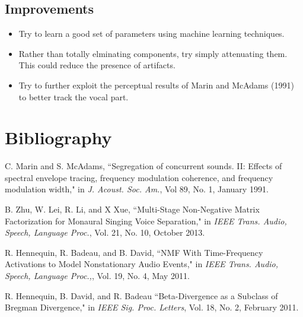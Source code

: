 \documentclass[72pt]{article}
\begin{document}
\begin{Huge}
\newpage

\section*{Improvements}
\begin{itemize}
    \item Try to learn a good set of parameters using machine learning
techniques.
    \item Rather than totally elminating components, try simply attenuating
them. This could reduce the presence of artifacts.
    \item Try to further exploit the perceptual results of Marin and McAdams
(1991) to better track the vocal part.
\end{itemize}

\end{Huge}

\newpage
\section*{Bibliography}
\begin{flushleft}
C. Marin and S. McAdams, ``Segregation of concurrent sounds. II: Effects of
spectral envelope tracing, frequency modulation coherence, and frequency
modulation width," in \textit{J. Acoust. Soc. Am.}, Vol 89, No. 1, January 1991.
\par
B. Zhu, W. Lei, R. Li, and X Xue, ``Multi-Stage Non-Negative Matrix
Factorization for Monaural Singing Voice Separation," in \textit{IEEE Trans.
Audio, Speech, Language Proc.}, Vol. 21, No. 10, October 2013.
\par
R. Hennequin, R. Badeau, and B. David, ``NMF With Time-Frequency Activations to
Model Nonstationary Audio Events," in \textit{IEEE Trans.
Audio, Speech, Language Proc.,}, Vol. 19, No. 4, May 2011.
\par
R. Hennequin, B. David, and R. Badeau ``Beta-Divergence as a Subclass of Bregman
Divergence," in \textit{IEEE Sig. Proc. Letters}, Vol. 18, No. 2, February 2011.
\end{flushleft}
\end{document}
